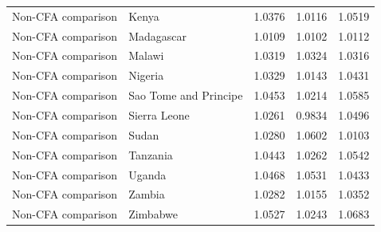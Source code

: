 \begin{table}
\begin{tabular}[t]{llrrr}
Non-CFA comparison & Kenya & 1.0376 & 1.0116 & 1.0519\\
\addlinespace
Non-CFA comparison & Madagascar & 1.0109 & 1.0102 & 1.0112\\
Non-CFA comparison & Malawi & 1.0319 & 1.0324 & 1.0316\\
Non-CFA comparison & Nigeria & 1.0329 & 1.0143 & 1.0431\\
Non-CFA comparison & Sao Tome and Principe & 1.0453 & 1.0214 & 1.0585\\
Non-CFA comparison & Sierra Leone & 1.0261 & 0.9834 & 1.0496\\
\addlinespace
Non-CFA comparison & Sudan & 1.0280 & 1.0602 & 1.0103\\
Non-CFA comparison & Tanzania & 1.0443 & 1.0262 & 1.0542\\
Non-CFA comparison & Uganda & 1.0468 & 1.0531 & 1.0433\\
Non-CFA comparison & Zambia & 1.0282 & 1.0155 & 1.0352\\
Non-CFA comparison & Zimbabwe & 1.0527 & 1.0243 & 1.0683\\
\bottomrule
\end{tabular}
\end{table}